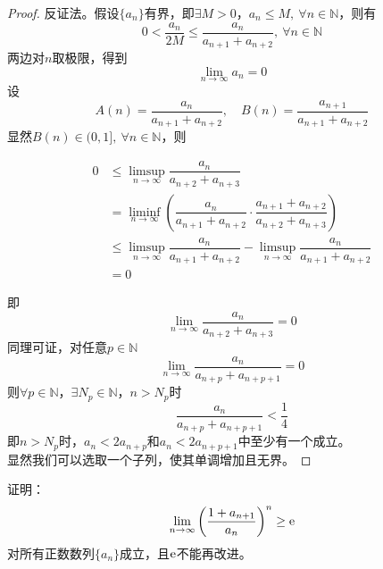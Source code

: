 \begin{proof}
    
    反证法。假设$\{a_n\}$有界，即$\exists M > 0$，$a_n \leq M,\ \forall n \in \mathbb{N}$，则有
    $$0 < \dfrac{a_n}{2M} \leq \dfrac{a_n}{a_{n + 1} + a_{n + 2}}, \ \forall n \in \mathbb{N}$$
    两边对$n$取极限，得到
    $$\lim\limits_{n \to \infty}{a_n} = 0$$
    设
    $$A(n) = \dfrac{a_n}{a_{n + 1} + a_{n + 2}}, \quad B(n) = \dfrac{a_{n + 1}}{a_{n + 1} + a_{n + 2}}$$
    显然$B(n) \in (0,1],\  \forall n \in \mathbb{N}$，则
    
    \begin{align*}
        0 & \leq \limsup_{n \to \infty}{\dfrac{a_n}{a_{n + 2} + a_{n + 3}}} \\
        & = \liminf_{n \to \infty}{\left( \dfrac{a_n}{a_{n + 1} + a_{n + 2}} \cdot \dfrac{a_{n + 1} + a_{n + 2}}{a_{n + 2} + a_{n + 3}} \right)} \\
        & \leq \limsup_{n \to \infty}{\dfrac{a_n}{a_{n + 1} + a_{n + 2}}} - \limsup_{n \to \infty}{\dfrac{a_n}{a_{n + 1} + a_{n + 2}}} \\
        & = 0
    \end{align*}
    
    即
    $$\lim\limits_{n \to \infty}{\dfrac{a_n}{a_{n + 2} + a_{n + 3}}} = 0$$
    同理可证，对任意$p \in \mathbb{N}$
    $$\lim\limits_{n \to \infty}{\dfrac{a_n}{a_{n + p} + a_{n + p + 1}}} = 0$$
    则$\forall p \in \mathbb{N}$，$\exists N_p \in \mathbb{N}$，$n > N_p$时
    $$\dfrac{a_n}{a_{n + p} + a_{n + p + 1}} < \dfrac{1}{4}$$
    即$n > N_p$时，$a_n < 2a_{n + p}$和$a_n < 2a_{n + p + 1}$中至少有一个成立。\\
    显然我们可以选取一个子列，使其单调增加且无界。
    
\end{proof}

\begin{proposition}

    证明：
    $$\lim\limits_{n \to \infty}{\left( \dfrac{1 + a_{n + 1}}{a_n} \right)^n} \geq \mathrm{e}$$
    对所有正数数列$\{a_n\}$成立，且$\mathrm{e}$不能再改进。

\end{proposition}

